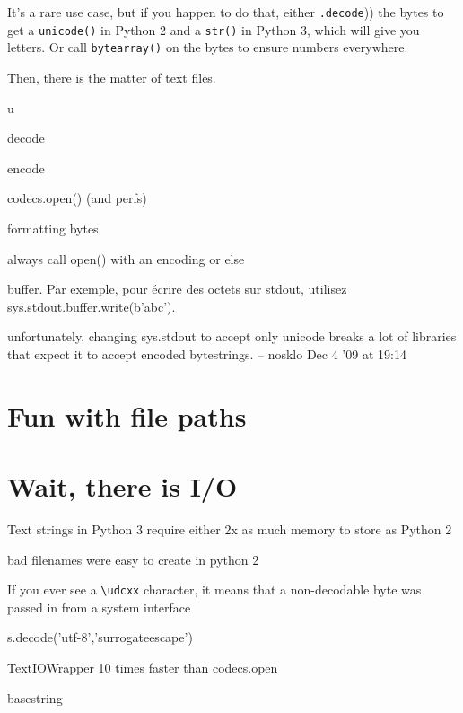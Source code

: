 It's a rare use case, but if you happen to do that, either \lstinline(.decode()) the bytes to get a \lstinline{unicode()} in Python 2 and a \lstinline{str()} in Python 3, which will give you letters. Or call \lstinline{bytearray()} on the bytes to ensure numbers everywhere.

Then, there is the matter of text files.


u

decode

encode

codecs.open() (and perfs)

formatting bytes

always call open() with an encoding or else

buffer. Par exemple, pour écrire des octets sur stdout, utilisez sys.stdout.buffer.write(b'abc').

unfortunately, changing sys.stdout to accept only unicode breaks a lot of libraries that expect it to accept encoded bytestrings. – nosklo Dec 4 '09 at 19:14


\section{Fun with file paths}

\section{Wait, there is I/O}


Text strings in Python 3 require either 2x as much memory to store as Python 2


bad filenames were easy to create in python 2

If you ever see a \lstinline{\udcxx} character, it means that a non-decodable byte was passed in from a system interface

s.decode('utf-8','surrogateescape')

TextIOWrapper 10 times faster than codecs.open

basestring


